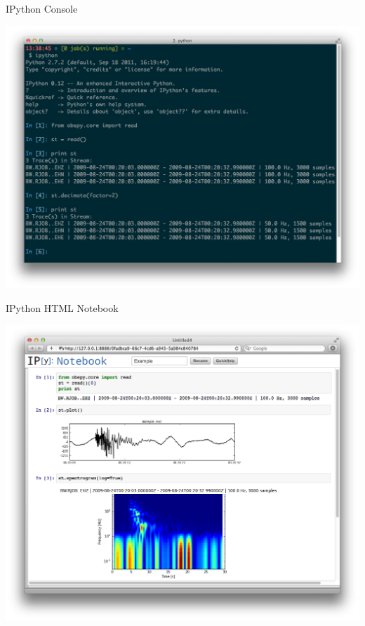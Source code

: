 \documentclass[handout]{beamer}
\begin{document}
\begin{frame}[plain]{IPython Console}
    \begin{center}
        \includegraphics[height=0.94\paperheight]{images/ipy_screenshot.png}
    \end{center}
\end{frame}

\begin{frame}[plain]{IPython HTML Notebook}
    \begin{center}
        \includegraphics[height=0.95\paperheight]{images/ipy_notebook.png}
    \end{center}
\end{frame}
\end{document}
